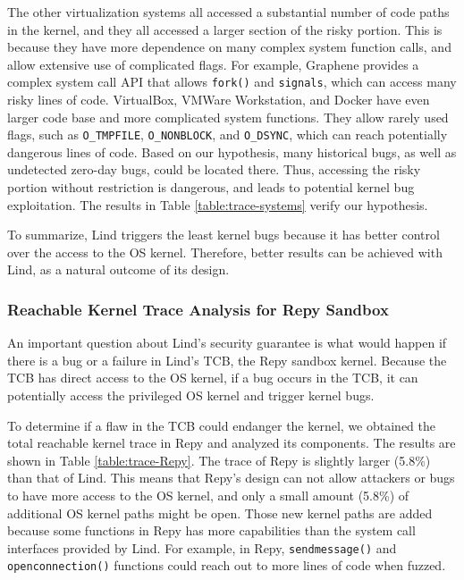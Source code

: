 The other virtualization systems all accessed a substantial number of code
paths in the kernel,
and they all accessed a larger section of the risky portion.
This is because they have
more dependence on many complex system function calls, and
allow extensive use of complicated flags. For example,
Graphene provides a complex system call API that allows
\texttt{fork()} and \texttt{signals}, which can access many risky lines of code.
VirtualBox, VMWare Workstation, and Docker have even larger
code base and more complicated system functions. They allow
rarely used flags, such as \texttt{O\_TMPFILE}, \texttt{O\_NONBLOCK},
and \texttt{O\_DSYNC}, which can reach potentially dangerous lines
of code.
%
Based on our hypothesis, many historical bugs, as well as undetected
zero-day bugs, could be located there.
Thus, accessing the risky portion without restriction is dangerous, and
leads to potential kernel bug exploitation. The results in Table
\ref{table:trace-systems} verify our hypothesis.

To summarize, Lind triggers the least kernel bugs because
it has better control over the access to the OS kernel.
Therefore, better results can be achieved with Lind, as a natural
outcome of its design.

\subsubsection{Reachable Kernel Trace Analysis for Repy Sandbox}
\label{Reachable-Kernel-Trace-Analysis-for-Repy-Sandbox}

An important question about Lind's security guarantee is what would happen if
there is a bug or a failure in Lind's TCB,
the Repy sandbox kernel. Because the TCB has direct access to the OS
kernel, if a bug occurs in the TCB,
it can potentially access the privileged OS kernel and trigger kernel bugs.

To determine if a flaw in the TCB could endanger the kernel,
we obtained the total reachable kernel trace in Repy and analyzed its
components.
The results are shown in Table \ref{table:trace-Repy}. The trace of Repy is
slightly larger (5.8\%) than that of Lind.
This means that Repy's design can not allow attackers or bugs to
have more access to the OS kernel, and only a small amount (5.8\%) of
additional OS kernel paths might be open.
Those new kernel paths are added because some functions in Repy
has more capabilities than the system call interfaces
provided by Lind. For example, in Repy,
\texttt{sendmessage()} and \texttt{openconnection()}
functions could reach out to more lines of code when fuzzed.

